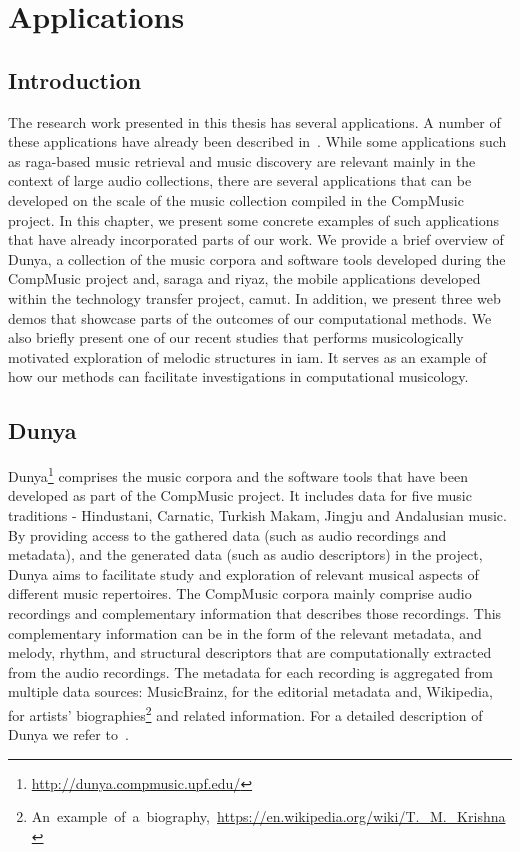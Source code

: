 
\chapter{Applications}
\label{chap:applicatoins}

\section{Introduction}
\label{sec:applications_introduction}

The research work presented in this thesis has several applications. A number of these applications have already been described in~. While some applications such as \gls{raga}-based music retrieval and music discovery are relevant mainly in the context of large audio collections, there are several applications that can be developed on the scale of the music collection compiled in the CompMusic project. In this chapter, we present some concrete examples of such applications that have already incorporated parts of our work. We provide a brief overview of Dunya, a collection of the music corpora and software tools developed during the CompMusic project and, \Gls{saraga} and \Gls{riyaz}, the mobile applications developed within the technology transfer project, \gls{camut}. In addition, we present three web demos that showcase parts of the outcomes of our computational methods. We also briefly present one of our recent studies that performs musicologically motivated exploration of melodic structures in \gls{iam}. It serves as an example of how our methods can facilitate investigations in computational musicology.

\section{Dunya}
\label{sec:applications_dunya}

Dunya\footnote{\url{http://dunya.compmusic.upf.edu/}} comprises the music corpora and the software tools that have been developed as part of the CompMusic project. It includes data for five music traditions - Hindustani, Carnatic, Turkish Makam, Jingju and Andalusian music. By providing access to the gathered data (such as audio recordings and metadata), and the generated data (such as audio descriptors) in the project, Dunya aims to facilitate study and exploration of relevant musical aspects of different music repertoires. The CompMusic corpora mainly comprise audio recordings and complementary information that describes those recordings. This complementary information can be in the form of the relevant metadata, and melody, rhythm, and structural descriptors that are computationally extracted from the audio recordings. The metadata for each recording is aggregated from multiple data sources: MusicBrainz, for the editorial metadata and, Wikipedia, for artists' biographies\footnote{An~example~of~a~biography,~\url{https://en.wikipedia.org/wiki/T._M._Krishna}} and related information. For a detailed description of Dunya we refer to~\cite{dunya_porter}.

